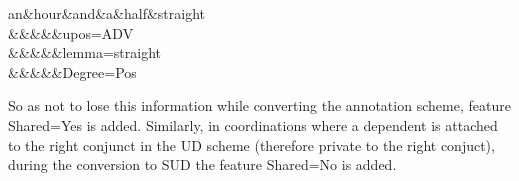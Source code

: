 \begin{exe}
    \ex
    \label{ex:UD 1,5h straight}
    \begin{dependency}[theme = simple, baseline=-\the\dimexpr\fontdimen22\textfont2\relax]
        \begin{deptext}
            an\&hour\&and\&a\&half\&straight\\
            \&\&\&\&\&\footnotesize\textsf{upos=ADV}\\
            \&\&\&\&\&\footnotesize\textsf{lemma=straight}\\
            \&\&\&\&\&\footnotesize\textsf{Degree=Pos}\\
        \end{deptext}
    \end{dependency}
\end{exe}

\begin{exe}
    \ex
    \label{ex:SUD 1,5h straight}
\end{exe}

So as not to lose this information while converting the annotation scheme, feature \textsf{Shared=Yes} is added. Similarly, in coordinations where a dependent is attached to the right conjunct in the UD scheme (therefore private to the right conjuct), during the conversion to SUD the feature \textsf{Shared=No} is added.

